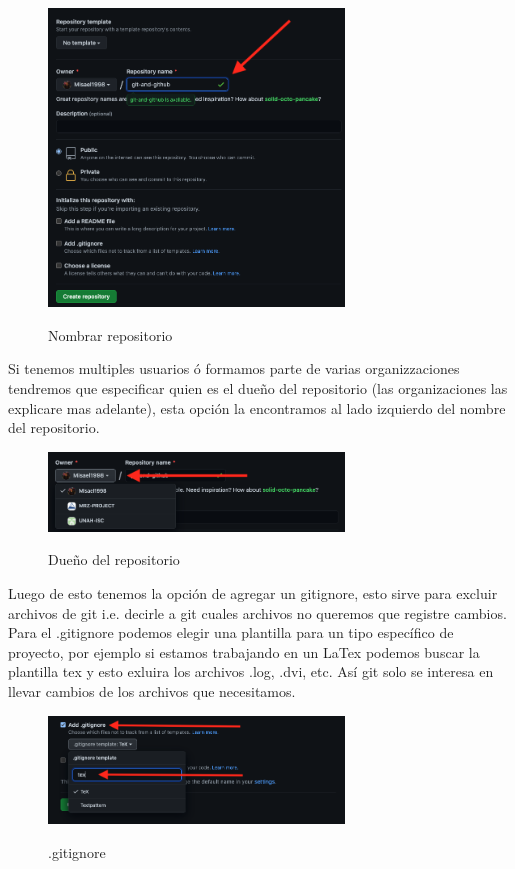 \documentclass[11pt, oneside]{article}
\begin{document}
\begin{figure}[H]
  \centering
  \caption{Nombrar repositorio}
  \includegraphics[width=0.70\textwidth]{./img/github-new-repo-2.png}
  \label{fig:github-new-repo-2}
\end{figure}

Si tenemos multiples usuarios ó formamos parte de varias organizzaciones tendremos que especificar quien es el dueño del repositorio (las organizaciones las explicare mas adelante), esta opción la encontramos al lado izquierdo del nombre del repositorio.

\begin{figure}[H]
  \centering
  \caption{Dueño del repositorio}
  \includegraphics[width=0.70\textwidth]{./img/github-new-repo-3.png}
  \label{fig:github-new-repo-3}
\end{figure}

Luego de esto tenemos la opción de agregar un gitignore, esto sirve para excluir archivos de git i.e. decirle a git cuales archivos no queremos que registre cambios. Para el .gitignore podemos elegir una plantilla para un tipo específico de proyecto, por ejemplo si estamos trabajando en un LaTex podemos buscar la plantilla tex y esto exluira los archivos .log, .dvi, etc. Así git solo se interesa en llevar cambios de los archivos que necesitamos.

\begin{figure}[H]
  \centering
  \caption{.gitignore}
  \includegraphics[width=0.70\textwidth]{./img/github-new-repo-4.png}
  \label{fig:github-new-repo-4}
\end{figure}
\end{document}
